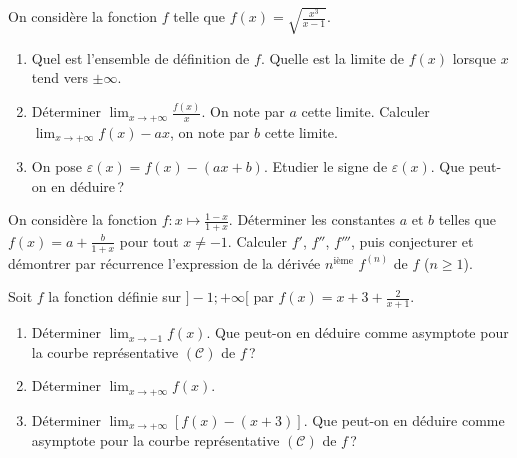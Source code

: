 %
      \begin{exo}
\label{exo:fn asym racine}
            On consid\`ere la fonction $f$ telle que $f(x) = \sqrt{\frac{x^3}{x-1}}$.
            \begin{enumerate}
                  \item Quel est l'ensemble de d\'efinition de $f$.
                        Quelle est la limite de $f(x)$ lorsque $x$ tend vers $\pm \infty$.
                  \item D\'eterminer $\lim_{x\rightarrow+\infty} \frac{f(x)}{x}$. On note par $a$ cette limite.
                        Calculer $\lim_{x\rightarrow+\infty} f(x) - ax$, on note par $b$ cette limite.
                  \item On pose $\varepsilon (x) = f(x) - (ax + b)$.
                        Etudier le signe de $\varepsilon (x)$.
                        Que peut-on en d\'eduire\,?
            \end{enumerate}
      \end{exo}
%
      \begin{exo}
\label{exo:fn derivee n}
            On consid\`ere la fonction $f:x\mapsto\frac{1-x}{1+x}$.
            D\'eterminer les constantes $a$ et $b$ telles que $f(x) = a + \frac{b}{1+x}$ pour tout $x \neq -1$.
            Calculer $f'$, $f''$, $f'''$, puis conjecturer et d\'emontrer par r\'ecurrence l'expression de la d\'eriv\'ee $n^\text{i\`eme}$ $f^{(n)}$ de $f$ ($n \geq 1$).
      \end{exo}
%
      \begin{exo}
\label{exo:fn asym oblique}
            Soit $f$ la fonction d\'efinie sur $]-1 ; +\infty[$ par $f(x) = x + 3 + \frac{2}{x+1}$.
            \begin{enumerate}
                  \item D\'eterminer $\lim_{x\rightarrow-1} f(x)$.
                        Que peut-on en d\'eduire comme asymptote pour la courbe repr\'esentative $(\mathscr{C})$ de $f$\,?
                  \item D\'eterminer $\lim_{x\rightarrow+\infty} f(x)$.
                  \item D\'eterminer $\lim_{x\rightarrow+\infty} \left[ f(x) - (x+3) \right]$.
                        Que peut-on en d\'eduire comme asymptote pour la courbe repr\'esentative $(\mathscr{C})$ de $f$\,?
            \end{enumerate}
      \end{exo}
%
